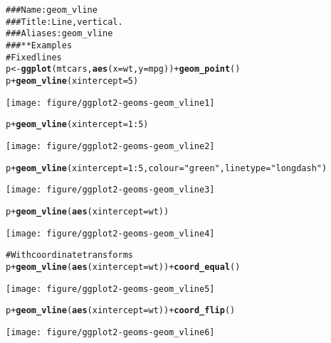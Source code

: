 \documentclass[a4paper,titlepage]{tufte-handout}\usepackage{graphicx, color}
\makeatletter
\def\maxwidth{ %
  \ifdim\Gin@nat@width>\linewidth
    \linewidth
  \else
    \Gin@nat@width
  \fi
}
\newcommand{\hlfunctioncall}[1]{\textcolor[rgb]{0.501960784313725,0,0.329411764705882}{\textbf{#1}}}%
\newcommand{\hlstring}[1]{\textcolor[rgb]{0.6,0.6,1}{#1}}%
\newcommand{\hlcomment}[1]{\textcolor[rgb]{0.180392156862745,0.6,0.341176470588235}{#1}}%
\newenvironment{kframe}{%
 \def\at@end@of@kframe{}%
 \ifinner\ifhmode%
  \def\at@end@of@kframe{\end{minipage}}%
  \begin{minipage}{\columnwidth}%
 \fi\fi%
 \def\FrameCommand##1{\hskip\@totalleftmargin \hskip-\fboxsep
 \colorbox{shadecolor}{##1}\hskip-\fboxsep
     \hskip-\linewidth \hskip-\@totalleftmargin \hskip\columnwidth}%
 \MakeFramed {\advance\hsize-\width
   \@totalleftmargin\z@ \linewidth\hsize
   \@setminipage}}%
 {\par\unskip\endMakeFramed%
 \at@end@of@kframe}
\newenvironment{knitrout}{}{} %
\makeatother
\begin{document}
\begin{knitrout}
\color{fgcolor}\begin{kframe}
\begin{alltt}
\hlcomment{### Name: geom_vline}
\hlcomment{### Title: Line, vertical.}
\hlcomment{### Aliases: geom_vline}
\hlcomment{### ** Examples}
\hlcomment{# Fixed lines}
p <- \hlfunctioncall{ggplot}(mtcars, \hlfunctioncall{aes}(x = wt, y = mpg)) + \hlfunctioncall{geom_point}()
p + \hlfunctioncall{geom_vline}(xintercept = 5)
\end{alltt}
\end{kframe}\texttt{[image: figure/ggplot2-geoms-geom\_vline1]} \begin{kframe}\begin{alltt}
p + \hlfunctioncall{geom_vline}(xintercept = 1:5)
\end{alltt}
\end{kframe}\texttt{[image: figure/ggplot2-geoms-geom\_vline2]} \begin{kframe}\begin{alltt}
p + \hlfunctioncall{geom_vline}(xintercept = 1:5, colour=\hlstring{"green"}, linetype = \hlstring{"longdash"})
\end{alltt}
\end{kframe}\texttt{[image: figure/ggplot2-geoms-geom\_vline3]} \begin{kframe}\begin{alltt}
p + \hlfunctioncall{geom_vline}(\hlfunctioncall{aes}(xintercept = wt))
\end{alltt}
\end{kframe}\texttt{[image: figure/ggplot2-geoms-geom\_vline4]} \begin{kframe}\begin{alltt}
\hlcomment{# With coordinate transforms}
p + \hlfunctioncall{geom_vline}(\hlfunctioncall{aes}(xintercept = wt)) + \hlfunctioncall{coord_equal}()
\end{alltt}
\end{kframe}\texttt{[image: figure/ggplot2-geoms-geom\_vline5]} \begin{kframe}\begin{alltt}
p + \hlfunctioncall{geom_vline}(\hlfunctioncall{aes}(xintercept = wt)) + \hlfunctioncall{coord_flip}()
\end{alltt}
\end{kframe}\texttt{[image: figure/ggplot2-geoms-geom\_vline6]} \begin{kframe}\begin{alltt}

\end{alltt}
\end{kframe}
\end{knitrout}
\end{document}
